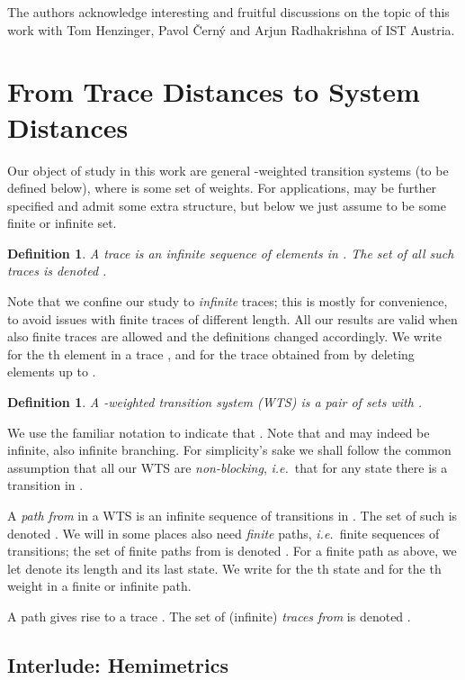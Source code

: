 \documentclass[copyright,creativecommons,sharealike]{eptcs}
\theoremstyle{plain}
\newtheorem{definition}[theorem]{Definition}
\newcommand*\ie{\textit{i.e.}}
\begin{document}
The authors acknowledge interesting and fruitful discussions on the
topic of this work with Tom Henzinger, Pavol {\v C}ern{\'y} and Arjun
Radhakrishna of IST Austria.

\section{From Trace Distances to System Distances}

Our object of study in this work are general -weighted transition
systems (to be defined below), where  is some set of weights.  For
applications,  may be further specified and admit some extra
structure, but below we just assume  to be some finite or infinite
set.

\begin{definition}
  A \emph{trace} is an infinite sequence  of elements in .  The set of all such traces is
  denoted .
\end{definition}

Note that we confine our study to \emph{infinite} traces; this is
mostly for convenience, to avoid issues with finite traces of
different length.  All our results are valid when also finite traces
are allowed and the definitions changed accordingly.  We write
 for the th element in a trace , and 
for the trace obtained from  by deleting elements 
up to .

\begin{definition}
  A \emph{-weighted transition system} (WTS) is a pair 
  of sets  with .
\end{definition}

We use the familiar notation  to indicate that .  Note that  and  may indeed be infinite, also
infinite branching.  For simplicity's sake we shall follow the common
assumption that all our WTS are \emph{non-blocking}, \ie~that for any
state  there is a transition  in .

A \emph{path from } in a WTS  is an infinite
sequence  of
transitions in .  The set of such is denoted .  We will
in some places also need \emph{finite} paths, \ie~finite sequences
 of transitions; the set
of finite paths from  is denoted .  For a finite path
 as above, we let  denote its length and  its last state.  We write  for the th state and  for the th weight in a finite
or infinite path.

A path  gives
rise to a trace .  The set of
(infinite) \emph{traces from } is denoted .

\subsection{Interlude: Hemimetrics}
\label{se:metrics}
\end{document}
